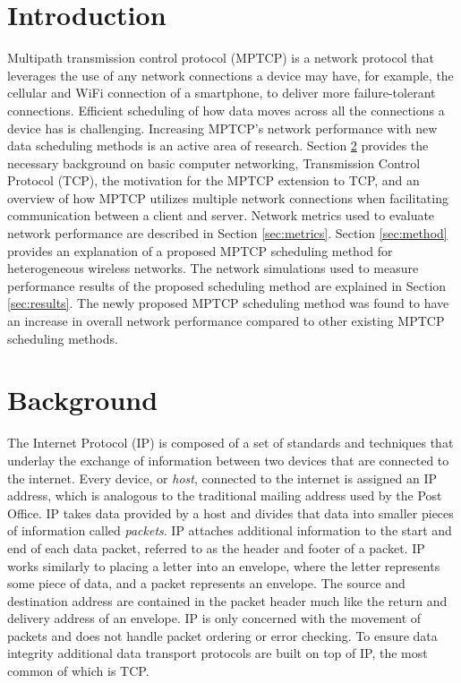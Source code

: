 \documentclass[sigplan,screen,nonacm]{acmart}
\begin{document}
\section{Introduction}
\label{sec:introduction}
Multipath transmission control protocol (MPTCP) is a network protocol that leverages 
the use of any network connections a device may have, for example, the cellular and WiFi connection of a smartphone, to deliver more failure-tolerant connections. Efficient scheduling of how data moves across all the connections a device has is challenging. Increasing MPTCP's network performance with new data scheduling methods is an active area of research. Section \ref{sec:background} provides the necessary background on basic computer networking, Transmission Control Protocol (TCP), the motivation for the MPTCP extension to TCP, and an overview of how MPTCP utilizes multiple network connections when facilitating communication between a client and server. Network metrics used to evaluate network performance are described in Section \ref{sec:metrics}. Section \ref{sec:method} provides an explanation of a proposed MPTCP scheduling method for heterogeneous wireless networks. The network simulations used to measure performance results of the proposed scheduling method are explained in Section \ref{sec:results}. The newly proposed MPTCP scheduling method was found to have an increase in overall network performance compared to other existing MPTCP scheduling methods.
\section{Background}
\label{sec:background}
The Internet Protocol (IP) is composed of a set of standards and techniques that underlay the exchange of information between two devices that are connected to the internet. Every device, or \emph{host}, connected to the internet is assigned an IP address, which is analogous to the traditional mailing address used by the Post Office. IP takes data provided by a host and divides that data into smaller pieces of information called \emph{packets}. IP attaches additional information to the start and end of each data packet, referred to as the header and footer of a packet. IP works similarly to placing a letter into an envelope, where the letter represents some piece of data, and a packet represents an envelope. The source and destination address are contained in the packet header much like the return and delivery address of an envelope. IP is only concerned with the movement of packets and does not handle packet ordering or error checking. To ensure data integrity additional data transport protocols are built on top of IP, the most common of which is TCP.
\end{document}
